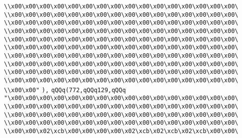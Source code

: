 \verb|\\x00\x00\x00\x00\x00\x00\x00\x00\x00\x00\x00\x00\x00\x00\x00\x00\|\newline
\verb|\\x00\x00\x00\x00\x00\x00\x00\x00\x00\x00\x00\x00\x00\x00\x00\x00\|\newline
\verb|\\x00\x00\x00\x00\x00\x00\x00\x00\x00\x00\x00\x00\x00\x00\x00\x00\|\newline
\verb|\\x00\x00\x00\x00\x00\x00\x00\x00\x00\x00\x00\x00\x00\x00\x00\x00\|\newline
\verb|\\x00\x00\x00\x00\x00\x00\x00\x00\x00\x00\x00\x00\x00\x00\x00\x00\|\newline
\verb|\\x00\x00\x00\x00\x00\x00\x00\x00\x00\x00\x00\x00\x00\x00\x00\x00\|\newline
\verb|\\x00\x00\x00\x00\x00\x00\x00\x00\x00\x00\x00\x00\x00\x00\x00\x00\|\newline
\verb|\\x00\x00\x00\x00\x00\x00\x00\x00\x00\x00\x00\x00\x00\x00\x00\x00\|\newline
\verb|\\x00\x00\x00\x00\x00\x00\x00\x00\x00\x00\x00\x00\x00\x00\x00\x00\|\newline
\verb|\\x00\x00\x00\x00\x00\x00\x00\x00\x00\x00\x00\x00\x00\x00\x00\x00\|\newline
\verb|\\x00\x00"|\newline
\verb|),|\newline
\verb|qQQq(772,qQQq129,qQQq|\newline
\verb|"\x00\x00\x00\x00\x00\x00\x00\x00\x00\x00\x00\x00\x00\x00\x00\x00\|\newline
\verb|\\x00\x00\x00\x00\x00\x00\x00\x00\x00\x00\x00\x00\x00\x00\x00\x00\|\newline
\verb|\\x00\x00\x00\x00\x00\x00\x00\x00\x00\x00\x00\x00\x00\x00\x00\x00\|\newline
\verb|\\x00\x00\x00\x00\x00\x00\x00\x00\x00\x00\x00\x00\x00\x00\x00\x00\|\newline
\verb|\\x00\x00\x02\xcb\x00\x00\x00\x00\x02\xcb\x02\xcb\x02\xcb\x00\x00\|\newline
